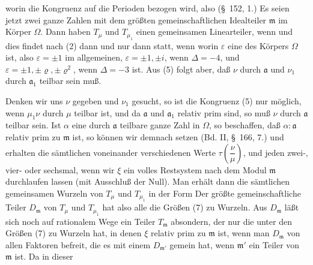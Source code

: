 worin die Kongruenz auf die Perioden bezogen wird, also (\S\ 152, 1.)
Es seien jetzt
zwei ganze Zahlen mit dem größten gemeinschaftlichen Idealteiler $\mathfrak{m}$ im Körper $\Omega$. Dann haben $T_\mu$ und $T_{\mu_1}$ einen gemeinsamen Linearteiler, wenn
und dies findet nach (2) dann und nur dann statt, wenn
worin $\varepsilon$ eine  des Körpers $\Omega$ ist, also $\varepsilon = \pm 1$ im allgemeinen, $\varepsilon = \pm 1, \pm i$, wenn $\Delta = -4$, und $\varepsilon = \pm 1, \pm\varrho, \pm\varrho^2$, wenn $\Delta = -3$ ist. Aus (5) folgt aber, daß $\nu$ durch $\mathfrak{a}$ und $\nu_1$ durch $\mathfrak{a}_1$ teilbar sein muß.

Denken wir uns $\nu$ gegeben und $\nu_1$ gesucht, so ist die Kongruenz (5) nur möglich, wenn $\mu_1\nu$ durch $\mu$ teilbar ist, und da $\mathfrak{a}$ und $\mathfrak{a}_1$ relativ prim sind, so muß $\nu$ durch $\mathfrak{a}$ teilbar sein. Ist $\alpha$ eine durch $\mathfrak{a}$ teilbare ganze Zahl in $\Omega$, so beschaffen, daß $\alpha : \mathfrak{a}$ relativ prim zu $\mathfrak{m}$ ist, so können wir demnach
setzen (Bd. II, \S\ 166, 7.) und erhalten die sämtlichen voneinander verschiedenen Werte $\tau\left(\dfrac{\nu}{\mu}\right)$, und jeden zwei-, vier- oder sechsmal, wenn wir $\xi$ ein volles Restsystem nach dem Modul $\mathfrak{m}$ durchlaufen lassen (mit Ausschluß der Null). Man erhält dann die sämtlichen gemeinsamen Wurzeln von $T_\mu$ und $T_{\mu_1}$ in der Form
Der größte gemeinschaftliche Teiler $D_{\mathfrak m}$ von $T_\mu$ und $T_{\mu_1}$ hat also alle die Größen (7) zu Wurzeln. Aus $D_{\mathfrak m}$ läßt sich noch auf rationalem Wege ein Teiler $T_{\mathfrak m}$ absondern, der nur die unter den Größen (7) zu Wurzeln hat, in denen $\xi$ relativ prim zu $\mathfrak{m}$ ist, wenn man $D_{\mathfrak m}$ von allen Faktoren befreit, die es mit einem $D_{\mathfrak m'}$ gemein hat, wenn $\mathfrak{m}'$ ein Teiler von $\mathfrak{m}$ ist. Da in dieser
